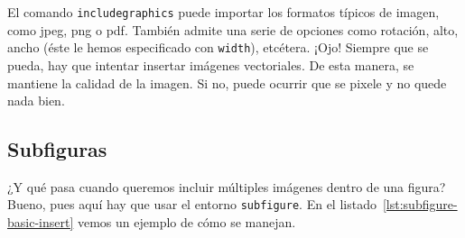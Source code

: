 El comando \texttt{includegraphics} puede importar los formatos típicos de imagen, como jpeg, png o pdf. También admite una serie de opciones como rotación, alto, ancho (éste le hemos especificado con \texttt{width}), etcétera. ¡Ojo! Siempre que se pueda, hay que intentar insertar imágenes vectoriales. De esta manera, se mantiene la calidad de la imagen. Si no, puede ocurrir que se pixele y no quede nada bien.

\subsection{Subfiguras}

¿Y qué pasa cuando queremos incluir múltiples imágenes dentro de una figura? Bueno, pues aquí hay que usar el entorno \texttt{subfigure}. En el listado~\ref{lst:subfigure-basic-insert} vemos un ejemplo de cómo se manejan.

